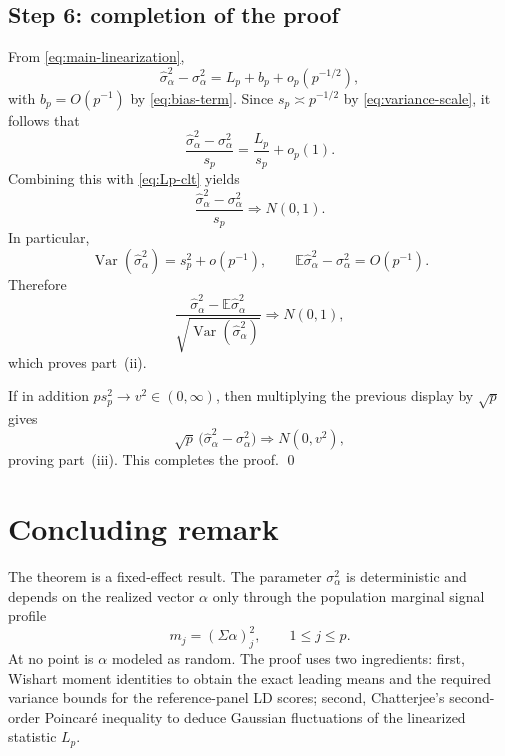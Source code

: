 \documentclass[11pt]{article}
\theoremstyle{definition}
\newcommand{\E}{\mathbb{E}}
\newcommand{\Var}{\operatorname{Var}}
\newcommand{\1}{\mathbf{1}}
\newcommand{\dto}{\Longrightarrow}
\begin{document}
\subsection*{Step 6: completion of the proof}

From \eqref{eq:main-linearization},
\[
 \widehat\sigma_\alpha^2-\sigma_\alpha^2=L_p+b_p+o_p(p^{-1/2}),
\]
with $b_p=O(p^{-1})$ by \eqref{eq:bias-term}. Since $s_p\asymp p^{-1/2}$ by \eqref{eq:variance-scale}, it follows that
\[
 \frac{\widehat\sigma_\alpha^2-\sigma_\alpha^2}{s_p}
 =\frac{L_p}{s_p}+o_p(1).
\]
Combining this with \eqref{eq:Lp-clt} yields
\[
 \frac{\widehat\sigma_\alpha^2-\sigma_\alpha^2}{s_p}\dto N(0,1).
\]
In particular,
\[
 \Var(\widehat\sigma_\alpha^2)=s_p^2+o(p^{-1}),
 \qquad
 \E\widehat\sigma_\alpha^2-\sigma_\alpha^2=O(p^{-1}).
\]
Therefore
\[
 \frac{\widehat\sigma_\alpha^2-\E\widehat\sigma_\alpha^2}{\sqrt{\Var(\widehat\sigma_\alpha^2)}}\dto N(0,1),
\]
which proves part~(ii).

If in addition $ps_p^2\to v^2\in(0,\infty)$, then multiplying the previous display by $\sqrt p$ gives
\[
 \sqrt p\,\bigl(\widehat\sigma_\alpha^2-\sigma_\alpha^2\bigr)\dto N(0,v^2),
\]
proving part~(iii). This completes the proof.
\qed

\section*{Concluding remark}

The theorem is a fixed-effect result. The parameter $\sigma_\alpha^2$ is deterministic and depends on the realized vector $\alpha$ only through the population marginal signal profile
\[
 m_j=(\Sigma\alpha)_j^2,
 \qquad 1\le j\le p.
\]
At no point is $\alpha$ modeled as random. The proof uses two ingredients: first, Wishart moment identities to obtain the exact leading means and the required variance bounds for the reference-panel LD scores; second, Chatterjee's second-order Poincar\'e inequality to deduce Gaussian fluctuations of the linearized statistic $L_p$.
\end{document}
